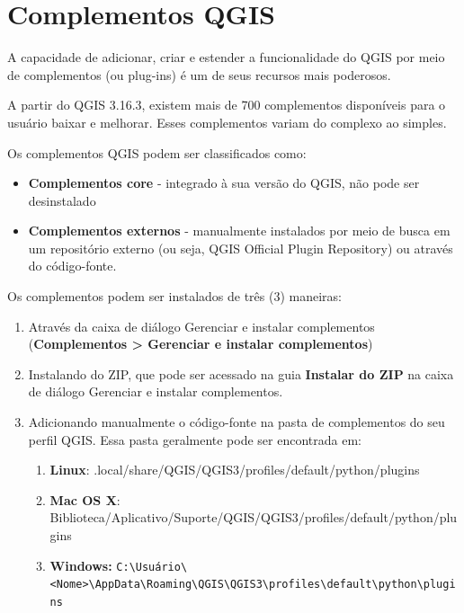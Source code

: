 \documentclass[
]{krantz}
\providecommand{\tightlist}{%
  \setlength{\itemsep}{0pt}\setlength{\parskip}{0pt}}
\begin{document}
\hypertarget{complementos-qgis}{%
\section{Complementos QGIS}\label{complementos-qgis}}

A capacidade de adicionar, criar e estender a funcionalidade do QGIS por meio de complementos (ou plug-ins) é um de seus recursos mais poderosos.

A partir do QGIS 3.16.3, existem mais de 700 complementos disponíveis para o usuário baixar e melhorar. Esses complementos variam do complexo ao simples.

Os complementos QGIS podem ser classificados como:

\begin{itemize}
\tightlist
\item
  \textbf{Complementos core} - integrado à sua versão do QGIS, não pode ser desinstalado
\item
  \textbf{Complementos externos} - manualmente instalados por meio de busca em um repositório externo (ou seja, QGIS Official Plugin Repository) ou através do código-fonte.
\end{itemize}

Os complementos podem ser instalados de três (3) maneiras:

\begin{enumerate}
\def\labelenumi{\arabic{enumi}.}
\tightlist
\item
  Através da caixa de diálogo Gerenciar e instalar complementos (\textbf{Complementos \textgreater{} Gerenciar e instalar complementos})
\item
  Instalando do ZIP, que pode ser acessado na guia \textbf{Instalar do ZIP} na caixa de diálogo Gerenciar e instalar complementos.
\item
  Adicionando manualmente o código-fonte na pasta de complementos do seu perfil QGIS. Essa pasta geralmente pode ser encontrada em:

  \begin{enumerate}
  \def\labelenumii{\arabic{enumii}.}
  \tightlist
  \item
    \textbf{Linux}: .local/share/QGIS/QGIS3/profiles/default/python/plugins
  \item
    \textbf{Mac OS X}: Biblioteca/Aplicativo/Suporte/QGIS/QGIS3/profiles/default/python/plugins
  \item
    \textbf{Windows:} \texttt{C:\textbackslash{}Usuário\textbackslash{}\textless{}Nome\textgreater{}\textbackslash{}AppData\textbackslash{}Roaming\textbackslash{}QGIS\textbackslash{}QGIS3\textbackslash{}profiles\textbackslash{}default\textbackslash{}python\textbackslash{}plugins}
  \end{enumerate}
\end{enumerate}
\end{document}
